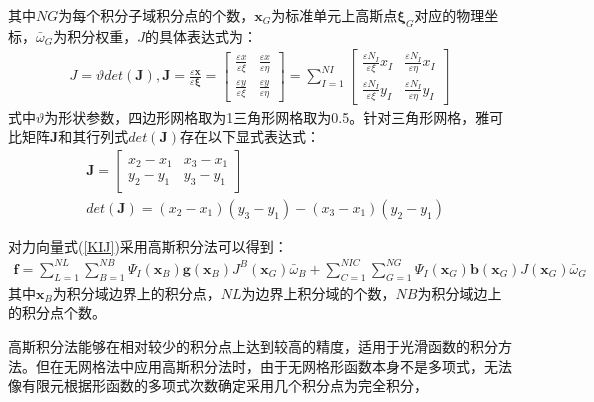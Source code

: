 其中$N\!G$为每个积分子域积分点的个数，$\pmb{x}_G$为标准单元上高斯点$\pmb{\xi}_G$对应的物理坐标，$\bar{\omega}_G$为积分权重，$J$的具体表达式为：
\begin{equation}
\begin{split}
    J=\vartheta det(\pmb J),\pmb{J}=\frac{\varepsilon\pmb{x}}{\varepsilon\pmb{\xi}}=
    \left[\begin{matrix}
        \frac{\varepsilon x}{\varepsilon\xi}&\frac{\varepsilon x}{\varepsilon\eta}
        \\\frac{\varepsilon y}{\varepsilon\xi}&\frac{\varepsilon y}{\varepsilon\eta}
    \end{matrix}\right]=\sum_{I=1}^{N\!I}
    \left[\begin{matrix}
        \frac{\varepsilon N_I}{\varepsilon\xi}x_I&\frac{\varepsilon N_I}{\varepsilon\eta}x_I
        \\\frac{\varepsilon N_I}{\varepsilon\xi}y_I&\frac{\varepsilon N_I}{\varepsilon\eta}y_I
    \end{matrix}\right]
\end{split}
\end{equation}
式中$\vartheta$为形状参数，四边形网格取为1三角形网格取为0.5。针对三角形网格，雅可比矩阵$\pmb{J}$和其行列式$det(\pmb{J})$存在以下显式表达式：
\begin{equation}
\begin{split}
    &\pmb{J}=\left[\begin{matrix}
       x_2-x_1&x_3-x_1\\y_2-y_1&y_3-y_1
    \end{matrix}\right]\\
&det(\pmb{J})=(x_2-x_1)(y_3-y_1)-(x_3-x_1)(y_2-y_1)
\end{split}
\end{equation}\par
对力向量式(\ref{KIJ})采用高斯积分法可以得到：
\begin{equation}
\begin{split}
   \pmb{f}=\sum_{L=1}^{N\!L}\sum_{B=1}^{N\!B}\Psi_I(\pmb{x}_B)\pmb{g}(\pmb{x}_B)J^B(\pmb{x}_G)\bar{\omega}_B+\sum_{C=1}^{N\!I\!C}\sum_{G=1}^{N\!G}\Psi_I(\pmb{x}_G)\pmb{b}(\pmb{x}_G)J(\pmb{x}_G)\bar{\omega}_G
\end{split}
\end{equation}
其中$\pmb{x}_B$为积分域边界上的积分点，$N\!L$为边界上积分域的个数，$N\!B$为积分域边上的积分点个数。\par
高斯积分法能够在相对较少的积分点上达到较高的精度，适用于光滑函数的积分方法。但在无网格法中应用高斯积分法时，由于无网格形函数本身不是多项式，无法像有限元根据形函数的多项式次数确定采用几个积分点为完全积分，
